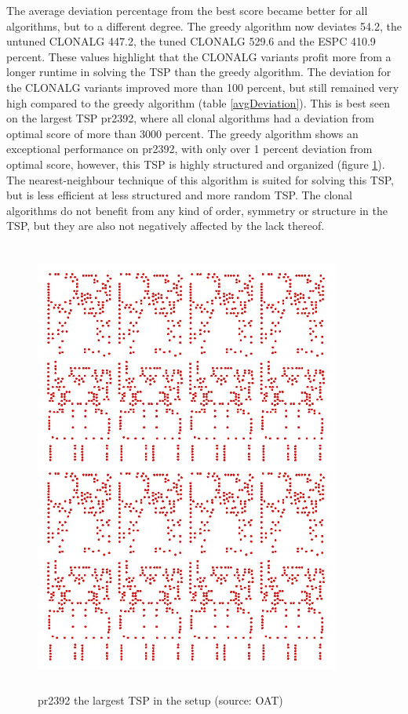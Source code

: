 \newpage
The average deviation percentage from the best score became better for all algorithms, but to a different degree. The greedy algorithm now deviates 54.2, the untuned CLONALG 447.2, the tuned CLONALG 529.6 and the ESPC 410.9 percent. These values highlight that the CLONALG variants profit more from a longer runtime in solving the TSP than the greedy algorithm. The deviation for the CLONALG variants improved more than 100 percent, but still remained very high compared to the greedy algorithm (table \ref{avgDeviation}). This is best seen on the largest TSP pr2392, where all clonal algorithms had a deviation from optimal score of more than 3000 percent. The greedy algorithm shows an exceptional performance on pr2392, with only over 1 percent deviation from optimal score, however, this TSP is highly structured and organized (figure \ref{pr2392}). The nearest-neighbour technique of this algorithm is suited for solving this TSP, but is less efficient at less structured and more random TSP. The clonal algorithms do not benefit from any kind of order, symmetry or structure in the TSP, but they are also not negatively affected by the lack thereof. 
\begin{figure}[H]
	\includegraphics[width=10cm, height=15cm]{Images/pr2392.jpg}
	\caption{pr2392 the largest TSP in the setup (source: OAT)}
	\label{pr2392}
\end{figure}
